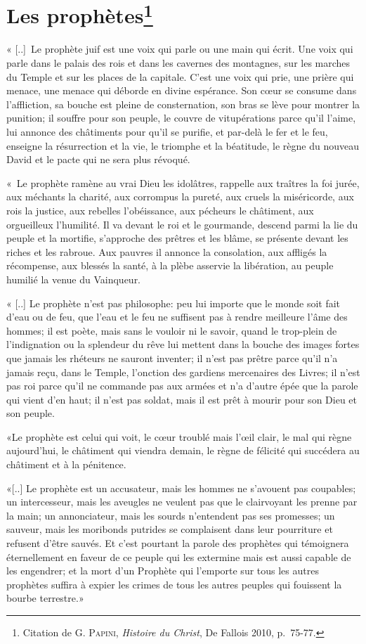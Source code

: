\section*{Les prophètes\footnote{Citation de \textsc{G. Papini}, \textit{Histoire du Christ}, De Fallois 2010, p.~75-77.}}
\decalage « [..]~Le prophète juif est une voix qui parle ou une main qui écrit. Une voix qui parle dans le palais des rois et dans les cavernes des montagnes, sur les marches du Temple et sur les places de la capitale. C'est une voix qui prie, une prière qui menace, une menace qui déborde en divine espérance. Son cœur se consume dans l'affliction, sa bouche est pleine de consternation, son bras se lève pour montrer la punition; il souffre pour son peuple, le couvre de vitupérations parce qu'il l'aime, lui annonce des châtiments pour qu'il se purifie, et par-delà le fer et le feu, enseigne la résurrection et la vie, le triomphe et la béatitude, le règne du nouveau David et le pacte qui ne sera plus révoqué.\par
\decalage «~Le prophète ramène au vrai Dieu les idolâtres, rappelle aux traîtres la foi jurée, aux méchants la charité, aux corrompus la pureté, aux cruels la miséricorde, aux rois la justice, aux rebelles l'obéissance, aux pécheurs le châtiment, aux orgueilleux l'humilité. Il va devant le roi et le gourmande, descend parmi la lie du peuple et la mortifie, s'approche des prêtres et les blâme, se présente devant les riches et les rabroue. Aux pauvres il annonce la consolation, aux affligés la récompense, aux blessés la santé, à la plèbe asservie la libération, au peuple humilié la venue du Vainqueur.\par
\decalage « [..] Le prophète n'est pas philosophe: peu lui importe que le monde soit fait d'eau ou de feu, que l'eau et le feu ne suffisent pas à rendre meilleure l'âme des hommes; il est poète, mais sans le vouloir ni le savoir, quand le trop-plein de l'indignation ou la splendeur du rêve lui mettent dans la bouche des images fortes que jamais les rhéteurs ne sauront inventer; il n'est pas prêtre parce qu'il n'a jamais reçu, dans le Temple, l'onction des gardiens mercenaires des Livres; il n'est pas roi parce qu'il ne commande pas aux armées et n'a d'autre épée que la parole qui vient d'en haut; il n'est pas soldat, mais il est prêt à mourir pour son Dieu et son peuple. \par
\decalage «Le prophète est celui qui voit, le cœur troublé mais l'œil clair, le mal qui règne aujourd'hui, le châtiment qui viendra demain, le règne de félicité qui succédera au châtiment et à la pénitence.\par
\decalage «[..] Le prophète est un accusateur, mais les hommes ne s'avouent pas coupables; un intercesseur, mais les aveugles ne veulent pas que le clairvoyant les prenne par la main; un annonciateur, mais les sourds n'entendent pas ses promesses; un sauveur, mais les moribonds putrides se complaisent dans leur pourriture et refusent d'être sauvés. Et c'est pourtant la parole des prophètes qui témoignera éternellement en faveur de ce peuple qui les extermine mais est aussi capable de les engendrer; et la mort d'un Prophète qui l'emporte sur tous les autres prophètes suffira à expier les crimes de tous les autres peuples qui fouissent la bourbe terrestre.»

